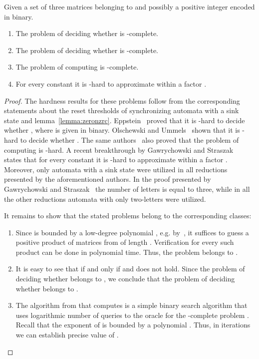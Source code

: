 \documentclass[a4paper,USenglish]{lipics}
\theoremstyle{definition}
\begin{document}
\begin{theorem}
\label{th:nzrcComplexity}
Given a set  of three  matrices belonging to  and possibly a positive integer  encoded in binary.
\begin{enumerate}
\item The problem of deciding whether  is -complete.
\item The problem of deciding whether  is -complete.
\item The problem of computing  is -complete.
\item For every constant  it is -hard to approximate  within a factor .
\end{enumerate}
\end{theorem}
\begin{proof}
The hardness results for these problems follow from the corresponding statements about the reset thresholds of synchronizing automata with a sink state and lemma~\ref{lemma:zeronzrc}. Eppstein~\cite{Ep1990} proved that it is -hard to decide whether , where  is given in binary. Olschewski and Ummels~\cite[Theorem 1]{OM2010} shown that it is -hard to decide whether . The same authors~\cite[Theorem 4]{OM2010} also proved that the problem of computing  is -hard. A recent breakthrough by Gawrychowski and Straszak~\cite[Theorem 16]{GawrychowskiStraszak2015StrongInapproximabilityOfTheShortestResetWord} states that for every constant  it is -hard to approximate  within a factor . Moreover, only automata with a sink state were utilized in all reductions presented by the aforementioned authors. In the proof presented by Gawrychowski and Straszak~\cite[Theorem 16]{GawrychowskiStraszak2015StrongInapproximabilityOfTheShortestResetWord} the number of letters  is equal to three, while in all the other reductions automata with only two-letters were utilized.

It remains to show that the stated problems belong to the corresponding classes:
\begin{enumerate}
\item Since  is bounded by a low-degree polynomial , e.g.  by~\cite[Corollary 18]{BJO15}, it suffices to guess a positive product of matrices from  of length . Verification for every such product can be done in polynomial time. Thus, the problem belongs to .
\item It is easy to see that  if and only if  and  does not hold. Since the problem of deciding whether  belongs to , we conclude that the problem of deciding whether  belongs to .
\item The algorithm from  that computes  is a simple binary search algorithm that uses logarithmic number of queries to the oracle for the -complete problem . Recall that the exponent of  is bounded by a polynomial . Thus, in  iterations we can establish precise value of .
\end{enumerate}
\end{proof}
\end{document}
